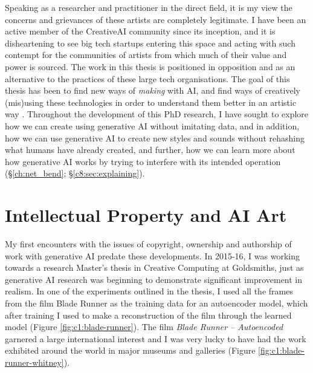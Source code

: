 Speaking as a researcher and practitioner in the direct field, it is my view the concerns and grievances of these artists are completely legitimate. 
I have been an active member of the CreativeAI community since its inception, and it is disheartening to see big tech startups entering this space and acting with such contempt for the communities of artists from which much of their value and power is sourced. 
The work in this thesis is positioned in opposition and as an alternative to the practices of these large tech organisations. 
The goal of this thesis has been to find new ways of \textit{making} with AI, and find ways of creatively (mis)using these technologies in order to understand them better in an artistic way \citep{salvaggio2023aarg}.
Throughout the development of this PhD research, I have sought to explore how we can create using generative AI without imitating data, and in addition, how we can use generative AI to create new styles and sounds without rehashing what humans have already created, and further, how we can learn more about how generative AI works by trying to interfere with its intended operation (\S \ref{ch:net_bend}; \S \ref{c8:sec:explaining}).

\section{Intellectual Property and AI Art}

My first encounters with the issues of copyright, ownership and authorship of work with generative AI predate these developments. 
In 2015-16, I was working towards a research Master's thesis in Creative Computing at Goldsmiths, just as generative AI research was beginning to demonstrate significant improvement in realism. 
In one of the experiments outlined in the thesis, I used all the frames from the film Blade Runner as the training data for an autoencoder model, which after training I used to make a reconstruction of the film through the learned model \citep{broad2016autoencoding} (Figure \ref{fig:c1:blade-runner}).
The film \textit{Blade Runner -- Autoencoded} garnered a large international interest and I was very lucky to have had the work exhibited around the world in major museums and galleries \citep{broad2017autoencoding} (Figure \ref{fig:c1:blade-runner-whitney}).

